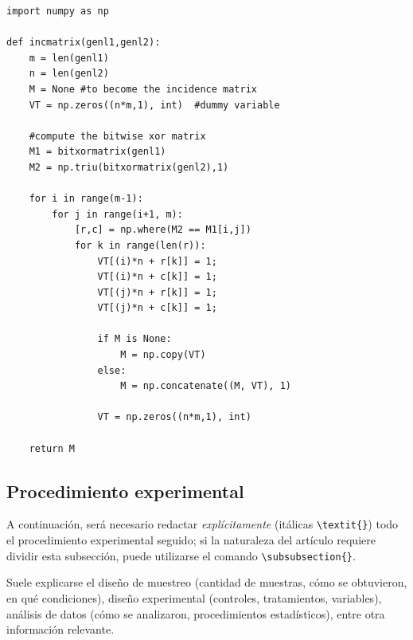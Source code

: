 \documentclass[fleqn,10pt]{SelfArx} %
\begin{document}
\begin{lstlisting}
import numpy as np
    
def incmatrix(genl1,genl2):
    m = len(genl1)
    n = len(genl2)
    M = None #to become the incidence matrix
    VT = np.zeros((n*m,1), int)  #dummy variable
    
    #compute the bitwise xor matrix
    M1 = bitxormatrix(genl1)
    M2 = np.triu(bitxormatrix(genl2),1) 

    for i in range(m-1):
        for j in range(i+1, m):
            [r,c] = np.where(M2 == M1[i,j])
            for k in range(len(r)):
                VT[(i)*n + r[k]] = 1;
                VT[(i)*n + c[k]] = 1;
                VT[(j)*n + r[k]] = 1;
                VT[(j)*n + c[k]] = 1;
                
                if M is None:
                    M = np.copy(VT)
                else:
                    M = np.concatenate((M, VT), 1)
                
                VT = np.zeros((n*m,1), int)
    
    return M
\end{lstlisting}

\subsection{Procedimiento experimental}

A continuación, será necesario redactar \textit{explícitamente} (itálicas \verb|\textit{}|) todo el procedimiento experimental seguido; si la naturaleza del artículo requiere dividir esta subsección, puede utilizarse el comando \verb|\subsubsection{}|.

Suele explicarse el diseño de muestreo (cantidad de muestras, cómo se obtuvieron, en qué condiciones), diseño experimental (controles, tratamientos, variables), análisis de datos (cómo se analizaron, procedimientos estadísticos), entre otra información relevante.
\end{document}
